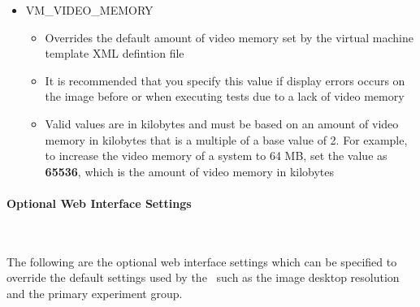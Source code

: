 \begin{itemize}
\item	VM\_VIDEO\_MEMORY
		\begin{itemize}
		\item	Overrides the default amount of video memory set by the virtual machine
				template XML defintion file
		\item	It is recommended that you specify this value if display errors occurs on the
				\cernvm image before or when executing tests due to a lack of video memory
		\item	Valid values are in kilobytes and must be based on an amount of video memory in
				kilobytes that is a multiple of a base value of 2. For example, to increase
				the video memory of a system to 64 MB, set the value as {\bf 65536}, which is the
				amount of video memory in kilobytes
		\end{itemize}
\end{itemize}


\paragraph*{Optional Web Interface Settings}~\newline

The following are the optional web interface settings which can be specified to override
the default settings used by the \cernvmtestframework\, such as the \cernvm image desktop
resolution and the primary experiment group.

